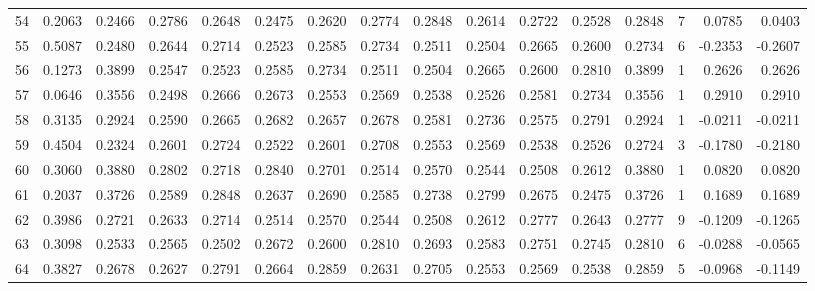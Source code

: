 \begin{tabular}{lrrrrrrrrrrrrrrr}
54  &      0.2063 &  0.2466 &  0.2786 &  0.2648 &  0.2475 &  0.2620 &  0.2774 &  0.2848 &  0.2614 &  0.2722 &   0.2528 &     0.2848 &      7 &                    0.0785 &                     0.0403 \\
55  &      0.5087 &  0.2480 &  0.2644 &  0.2714 &  0.2523 &  0.2585 &  0.2734 &  0.2511 &  0.2504 &  0.2665 &   0.2600 &     0.2734 &      6 &                   -0.2353 &                    -0.2607 \\
56  &      0.1273 &  0.3899 &  0.2547 &  0.2523 &  0.2585 &  0.2734 &  0.2511 &  0.2504 &  0.2665 &  0.2600 &   0.2810 &     0.3899 &      1 &                    0.2626 &                     0.2626 \\
57  &      0.0646 &  0.3556 &  0.2498 &  0.2666 &  0.2673 &  0.2553 &  0.2569 &  0.2538 &  0.2526 &  0.2581 &   0.2734 &     0.3556 &      1 &                    0.2910 &                     0.2910 \\
58  &      0.3135 &  0.2924 &  0.2590 &  0.2665 &  0.2682 &  0.2657 &  0.2678 &  0.2581 &  0.2736 &  0.2575 &   0.2791 &     0.2924 &      1 &                   -0.0211 &                    -0.0211 \\
59  &      0.4504 &  0.2324 &  0.2601 &  0.2724 &  0.2522 &  0.2601 &  0.2708 &  0.2553 &  0.2569 &  0.2538 &   0.2526 &     0.2724 &      3 &                   -0.1780 &                    -0.2180 \\
60  &      0.3060 &  0.3880 &  0.2802 &  0.2718 &  0.2840 &  0.2701 &  0.2514 &  0.2570 &  0.2544 &  0.2508 &   0.2612 &     0.3880 &      1 &                    0.0820 &                     0.0820 \\
61  &      0.2037 &  0.3726 &  0.2589 &  0.2848 &  0.2637 &  0.2690 &  0.2585 &  0.2738 &  0.2799 &  0.2675 &   0.2475 &     0.3726 &      1 &                    0.1689 &                     0.1689 \\
62  &      0.3986 &  0.2721 &  0.2633 &  0.2714 &  0.2514 &  0.2570 &  0.2544 &  0.2508 &  0.2612 &  0.2777 &   0.2643 &     0.2777 &      9 &                   -0.1209 &                    -0.1265 \\
63  &      0.3098 &  0.2533 &  0.2565 &  0.2502 &  0.2672 &  0.2600 &  0.2810 &  0.2693 &  0.2583 &  0.2751 &   0.2745 &     0.2810 &      6 &                   -0.0288 &                    -0.0565 \\
64  &      0.3827 &  0.2678 &  0.2627 &  0.2791 &  0.2664 &  0.2859 &  0.2631 &  0.2705 &  0.2553 &  0.2569 &   0.2538 &     0.2859 &      5 &                   -0.0968 &                    -0.1149 \\

\end{tabular}

